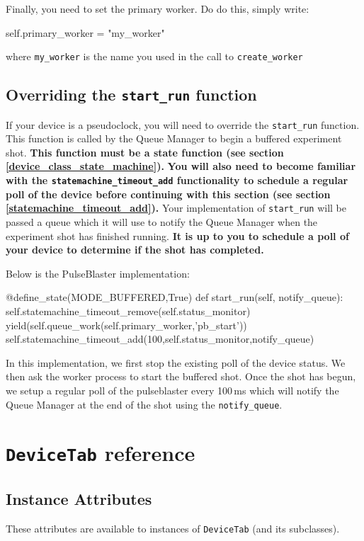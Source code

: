 \documentclass[12pt]{article}
\begin{document}
Finally, you need to set the primary worker.
Do do this, simply write:
\begin{python}
    self.primary_worker = "my_worker"
\end{python}
where \texttt{my\_worker} is the name you used in the call to \texttt{create\_worker}


\subsection{Overriding the \texttt{start\_run} function}
If your device is a pseudoclock, you will need to override the \texttt{start\_run} function.
This function is called by the Queue Manager to begin a buffered experiment shot.
\textbf{This function must be a state function (see section \ref{device_class_state_machine}).}
\textbf{You will also need to become familiar with the \texttt{statemachine\_timeout\_add} functionality to schedule a regular poll of the device before continuing with this section (see section \ref{statemachine_timeout_add}).}
Your implementation of \texttt{start\_run} will be passed a queue which it will use to notify the Queue Manager when the experiment shot has finished running.
\textbf{It is up to you to schedule a poll of your device to determine if the shot has completed.}

Below is the PulseBlaster implementation:
\begin{python}
@define_state(MODE_BUFFERED,True)  
def start_run(self, notify_queue):
    self.statemachine_timeout_remove(self.status_monitor)
    yield(self.queue_work(self.primary_worker,'pb_start'))
    self.statemachine_timeout_add(100,self.status_monitor,notify_queue)
\end{python}

In this implementation, we first stop the existing poll of the device status.
We then ask the worker process to start the buffered shot.
Once the shot has begun, we setup a regular poll of the pulseblaster every 100\,ms which will notify the Queue Manager at the end of the shot using the \texttt{notify\_queue}.


\section{\texttt{DeviceTab} reference}\label{device_class_reference}
\subsection{Instance Attributes}
These attributes are available to instances of \texttt{DeviceTab} (and its subclasses).
%
%
\end{document}
